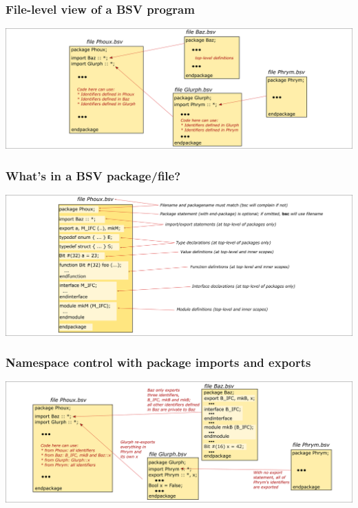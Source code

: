 
\begin{frame}
\frametitle{File-level view of a BSV program}

\begin{center}
\includegraphics[width=\textwidth]{../Figures/Fig_BSV_program_structure}
\end{center}

\end{frame}


\begin{frame}
\frametitle{What's in a BSV package/file?}

\begin{center}
\includegraphics[width=\textwidth]{../Figures/Fig_BSV_Package}
\end{center}

\end{frame}


\begin{frame}
\frametitle{Namespace control with package imports and exports}

\begin{center}
\includegraphics[width=\textwidth]{../Figures/Fig_BSV_namespace_control}
\end{center}

\end{frame}

